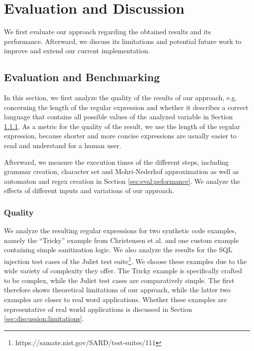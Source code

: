 \chapter{Evaluation and Discussion}
\label{chapter:Evaluation}

We first evaluate our approach regarding the obtained results and its performance. Afterward, we discuss its limitations and potential future work to improve and extend our current implementation.

\section{Evaluation and Benchmarking}

In this section, we first analyze the quality of the results of our approach, e.g. concerning the length of the regular expression and whether it describes a correct language that contains all possible values of the analyzed variable in Section \ref{sec:eval:quality}. As a metric for the quality of the result, we use the length of the regular expression, because shorter and more concise expressions are usually easier to read and understand for a human user.

Afterward, we measure the execution times of the different steps, including grammar creation, character set and Mohri-Nederhof approximation as well as automaton and regex creation in Section \ref{sec:eval:peformance}. We analyze the effects of different inputs and variations of our approach.

\subsection{Quality}\label{sec:eval:quality}

We analyze the resulting regular expressions for two synthetic code examples, namely the \enquote{Tricky} example from Christensen et al. \cite{brics} and one custom example containing simple sanitization logic. We also analyze the results for the SQL injection test cases of the Juliet test suite\footnote{https://samate.nist.gov/SARD/test-suites/111}. We choose these examples due to the wide variety of complexity they offer. The Tricky example is specifically crafted to be complex, while the Juliet test cases are comparatively simple. The first therefore shows theoretical limitations of our approach, while the latter two examples are closer to real word applications. Whether these examples are representative of real world applications is discussed in Section \ref{sec:discussion:limitations}.

